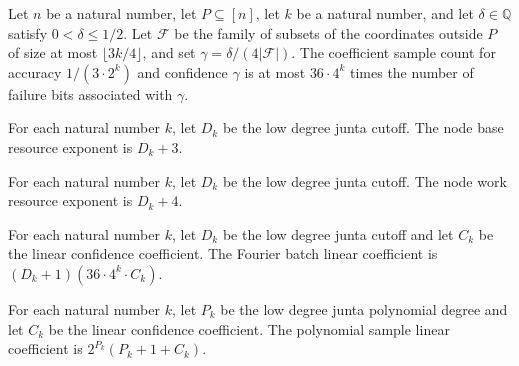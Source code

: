 \begin{theorem}
\label{FABL.lowDegreeJuntaCoefficientSampleCount_le_failureBits}
\leanok
{}
Let $n$ be a natural number, let $P\subseteq[n]$, let $k$ be a natural number, and let
$\delta\in\mathbb{Q}$ satisfy $0<\delta\leq1/2$. Let $\mathcal F$ be the family of
subsets of the coordinates outside $P$ of size at most $\lfloor3k/4\rfloor$, and set
$\gamma=\delta/(4|\mathcal F|)$. The coefficient sample count for accuracy
$1/(3\cdot2^k)$ and confidence $\gamma$ is at most $36\cdot4^k$ times the number of
failure bits associated with $\gamma$.
\end{theorem}

\begin{definition}
\label{FABL.lowDegreeJuntaNodeBaseResourceExponent}
\leanok
{}
For each natural number $k$, let $D_k$ be the low degree junta cutoff. The node base
resource exponent is $D_k+3$.
\end{definition}

\begin{definition}
\label{FABL.lowDegreeJuntaNodeWorkResourceExponent}
\leanok
{}
For each natural number $k$, let $D_k$ be the low degree junta cutoff. The node work
resource exponent is $D_k+4$.
\end{definition}

\begin{definition}
\label{FABL.lowDegreeJuntaFourierBatchLinearCoefficient}
\leanok
{}
For each natural number $k$, let $D_k$ be the low degree junta cutoff and let $C_k$ be
the linear confidence coefficient. The Fourier batch linear coefficient is
$(D_k+1)(36\cdot 4^k\cdot C_k)$.
\end{definition}

\begin{definition}
\label{FABL.lowDegreeJuntaPolynomialSampleLinearCoefficient}
\leanok
{}
For each natural number $k$, let $P_k$ be the low degree junta polynomial degree and let
$C_k$ be the linear confidence coefficient. The polynomial sample linear coefficient is
$2^{P_k}(P_k+1+C_k)$.
\end{definition}

